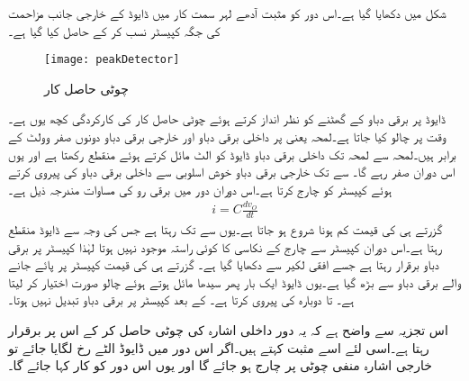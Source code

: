  
	شکل   میں  دکھایا گیا ہے۔اس دور کو مثبت آدھے لہر سمت کار میں ڈایوڈ   کے خارجی جانب مزاحمت کی جگہ کپیسٹر نسب کر کے حاصل کیا گیا ہے۔
\begin{figure}
\centering
\texttt{[image: peakDetector]}
\caption{چوٹی حاصل کار}
\label{شکل_چوٹی_حاصل_کار}
\end{figure}
ڈایوڈ پر برقی دباو کے  گھٹنے کو نظر انداز کرتے ہوئے چوٹی حاصل کار کی کارکردگی کچھ یوں ہے۔وقت  پر   چالو کیا جاتا ہے۔لمحہ یعنی  پر داخلی برقی دباو  اور خارجی برقی دباو  دونوں صفر وولٹ کے برابر ہیں۔لمحہ  سے لمحہ  تک داخلی برقی دباو ڈایوڈ کو الٹ مائل کرتے ہوئے منقطع رکھتا ہے اور یوں اس دوران  صفر رہے گا۔ سے  تک خارجی برقی دباو  خوش اسلوبی سے داخلی برقی دباو  کی پیروی کرتے ہوئے کپیسٹر کو چارج کرتا ہے۔اس دوران دور میں برقی رو کی مساوات مندرجہ ذیل ہے۔
\begin{align*}
i=C \frac{dv_O}{dt}
\end{align*}
 گزرتے ہی  کی قیمت کم ہونا شروع ہو جاتا ہے۔یوں  سے  تک  رہتا ہے جس کی وجہ سے ڈایوڈ منقطع رہتا ہے۔اس دوران کپیسٹر سے چارج کے نکاسی کا کوئی راستہ موجود نہیں ہوتا لہٰذا کپیسٹر پر برقی دباو برقرار رہتا ہے جسے افقی لکیر سے دکھایا گیا ہے۔ گزرتے ہی  کی قیمت کپیسٹر پر پائے جانے والے برقی دباو سے بڑھ گیا ہے۔یوں ڈایوڈ ایک بار پھر سیدھا مائل ہوتے ہوئے چالو صورت اختیار کر لیتا ہے۔ تا   دوبارہ  کی پیروی کرتا ہے۔ کے بعد کپیسٹر پر برقی دباو تبدیل نہیں ہوتا۔

اس تجزیہ سے واضح ہے کہ یہ دور داخلی اشارہ کی چوٹی حاصل کر کے اس پر برقرار رہتا ہے۔اسی لئے اسے مثبت   کہتے ہیں۔اگر اس دور میں ڈایوڈ الٹے رخ لگایا جائے تو خارجی اشارہ منفی چوٹی پر چارج ہو جائے گا اور یوں اس دور کو  کار کہا جائے گا۔

